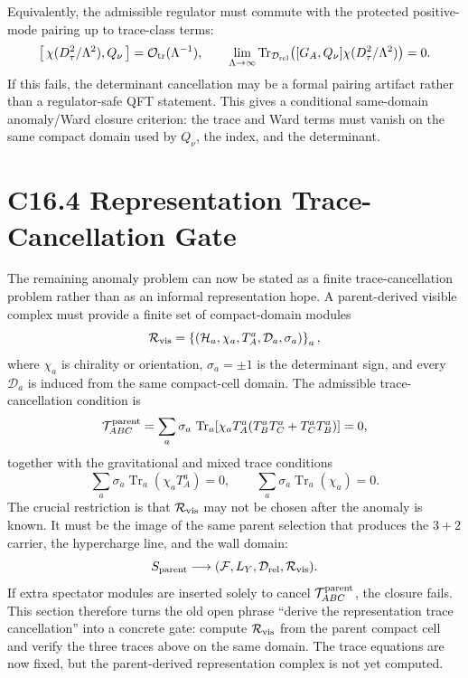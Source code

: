 \documentclass[11pt]{article}
\begin{document}
Equivalently, the admissible regulator must commute with the protected
positive-mode pairing up to trace-class terms:
\begin{equation}
\left[\,\chi(D_\tau^2/\Lambda^2),Q_\nu\,\right]
={\cal O}_{\rm tr}(\Lambda^{-1}),
\qquad
\lim_{\Lambda\to\infty}
\operatorname{Tr}_{\mathcal D_{\rm rel}}
\!\left([G_A,Q_\nu]\chi(D_\tau^2/\Lambda^2)\right)=0 .
\end{equation}
If this fails, the determinant cancellation may be a formal pairing artifact
rather than a regulator-safe QFT statement.  This gives a conditional
same-domain anomaly/Ward closure criterion: the trace and Ward terms must
vanish on the same compact domain used by $Q_\nu$, the index, and the
determinant.

\section{C16.4 Representation Trace-Cancellation Gate}
The remaining anomaly problem can now be stated as a finite trace-cancellation
problem rather than as an informal representation hope.  A parent-derived
visible complex must provide a finite set of compact-domain modules
\begin{equation}
{\cal R}_{\rm vis}
=
\left\lbrace
({\cal H}_a,\chi_a,T_A^a,\mathcal D_a,\sigma_a)
\right\rbrace_a ,
\end{equation}
where $\chi_a$ is chirality or orientation, $\sigma_a=\pm1$ is the determinant
sign, and every $\mathcal D_a$ is induced from the same compact-cell domain.
The admissible trace-cancellation condition is
\begin{equation}
{\cal T}_{ABC}^{\rm parent}
=
\sum_a
\sigma_a\,
\operatorname{Tr}_a
\!\left[
\chi_a T_A^a(T_B^aT_C^a+T_C^aT_B^a)
\right]
=0,
\end{equation}
together with the gravitational and mixed trace conditions
\begin{equation}
\sum_a\sigma_a\operatorname{Tr}_a(\chi_aT_A^a)=0,
\qquad
\sum_a\sigma_a\operatorname{Tr}_a(\chi_a)=0 .
\end{equation}
The crucial restriction is that ${\cal R}_{\rm vis}$ may not be chosen after
the anomaly is known.  It must be the image of the same parent selection that
produces the $3+2$ carrier, the hypercharge line, and the wall domain:
\begin{equation}
S_{\rm parent}
\longrightarrow
({\cal F},L_Y,\mathcal D_{\rm rel},{\cal R}_{\rm vis}).
\end{equation}
If extra spectator modules are inserted solely to cancel
${\cal T}_{ABC}^{\rm parent}$, the closure fails.  This section therefore
turns the old open phrase ``derive the representation trace cancellation''
into a concrete gate: compute ${\cal R}_{\rm vis}$ from the parent compact
cell and verify the three traces above on the same domain.  The trace equations
are now fixed, but the parent-derived representation complex is not yet
computed.
\end{document}
